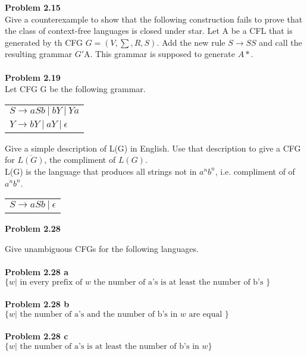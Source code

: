 \documentclass{article}
\newcommand{\problem}[1]{\large{\textbf{Problem #1} \\}}
\begin{document}
\problem{2.15}
Give a counterexample to show that the following construction fails to prove that the class of context-free languages is closed under star.
Let A be a CFL that is generated by th CFG $G = (V,\sum,R,S)$. Add the new rule $S \rightarrow SS$ and call the
resulting grammar $G'$A. This grammar is supposed to generate $A*$. \\ \\

\problem{2.19}
Let  CFG G be the following grammar.
\begin{table}[h!]
\centering
\begin{tabular}{l}
$S \rightarrow a S b\: | \:b Y \:|\: Y a $\\
$Y \rightarrow b Y \:| \:a Y \:| \:\epsilon$
\end{tabular}
\end{table}

Give a simple description of L(G) in English. Use that description to give a CFG for $\overline{L(G)}$, the compliment of $L(G)$. \\

L(G) is the language that produces all strings not in $a^nb^n$, i.e. compliment of of $a^nb^n$.

\begin{table}[h!]
\centering
\begin{tabular}{l}
$S \rightarrow a S b\: | \: \epsilon$
\end{tabular}
\end{table}

\problem{2.28}

Give unambiguous CFGs for the following languages.\\ \\
\problem{2.28 a}
$\{w| \text{ in every prefix of } w \text{ the number of a's is at least the number of b's }\}$ \\ \\
\problem{2.28 b}
$\{w| \text{ the number of a's and the number of b's in } w \text{ are equal }\}$ \\ \\
\problem{2.28 c}
$\{w| \text{ the number of a's is at least the number of b's in } w\}$ \\ \\
\end{document}

